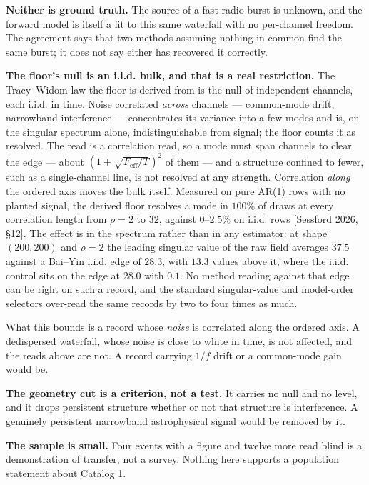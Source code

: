 \documentclass[10pt,letterpaper,twocolumn]{article}
\begin{document}
\textbf{Neither is ground truth.} The source of a fast radio burst is unknown, and the forward model is itself a fit to this same waterfall with no per-channel freedom. The agreement says that two methods assuming nothing in common find the same burst; it does not say either has recovered it correctly.

\textbf{The floor's null is an i.i.d. bulk, and that is a real restriction.} The Tracy--Widom law the floor is derived from is the null of independent channels, each i.i.d. in time. Noise correlated \emph{across} channels --- common-mode drift, narrowband interference --- concentrates its variance into a few modes and is, on the singular spectrum alone, indistinguishable from signal; the floor counts it as resolved. The read is a correlation read, so a mode must span channels to clear the edge --- about \((1+\sqrt{F_{\mathrm{eff}}/T})^2\) of them --- and a structure confined to fewer, such as a single-channel line, is not resolved at any strength. Correlation \emph{along} the ordered axis moves the bulk itself. Measured on pure AR(1) rows with no planted signal, the derived floor resolves a mode in \(100\%\) of draws at every correlation length from \(\rho=2\) to \(32\), against \(0\)--\(2.5\%\) on i.i.d. rows {[}Sessford 2026, §12{]}. The effect is in the spectrum rather than in any estimator: at shape \((200,200)\) and \(\rho=2\) the leading singular value of the raw field averages \(37.5\) against a Bai--Yin i.i.d. edge of \(28.3\), with \(13.3\) values above it, where the i.i.d. control sits on the edge at \(28.0\) with \(0.1\). No method reading against that edge can be right on such a record, and the standard singular-value and model-order selectors over-read the same records by two to four times as much.

What this bounds is a record whose \emph{noise} is correlated along the ordered axis. A dedispersed waterfall, whose noise is close to white in time, is not affected, and the reads above are not. A record carrying \(1/f\) drift or a common-mode gain would be.

\textbf{The geometry cut is a criterion, not a test.} It carries no null and no level, and it drops persistent structure whether or not that structure is interference. A genuinely persistent narrowband astrophysical signal would be removed by it.

\textbf{The sample is small.} Four events with a figure and twelve more read blind is a demonstration of transfer, not a survey. Nothing here supports a population statement about Catalog 1.
\end{document}
